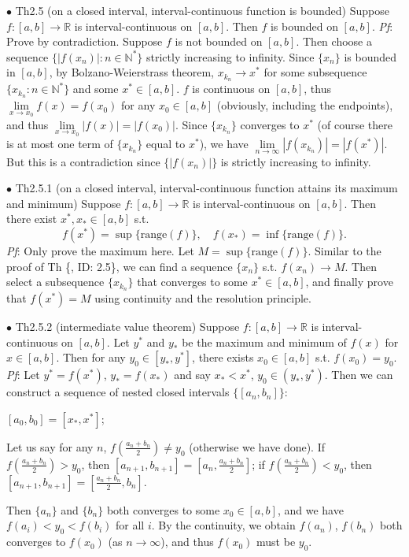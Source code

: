 \documentclass{article}
\begin{document}
\begin{Th}{$\bullet$ Th2.5 (on a closed interval, interval-continuous function is bounded)}
    Suppose $f:[a,b]\rightarrow\mathbb{R}$ is interval-continuous on $[a,b]$. Then $f$ is bounded on $[a,b]$.
    \tcblower
    \textit{Pf}: Prove by contradiction. Suppose $f$ is not bounded on $[a,b]$. Then choose a sequence $\{|f(x_n)|: n\in\mathbb{N}^*\}$ strictly increasing to infinity. Since $\{x_n\}$ is bounded in $[a,b]$, by Bolzano-Weierstrass theorem, $x_{k_n}\rightarrow x^*$ for some subsequence $\{x_{k_n}: n\in\mathbb{N}^*\}$ and some $x^*\in [a,b]$. $f$ is continuous on $[a,b]$, thus $\lim\limits_{x\to x_0}f(x) = f(x_0)$ for any $x_0\in[a,b]$ (obviously, including the endpoints), and thus $\lim\limits_{x\to x_0}|f(x)| = |f(x_0)|$. Since $\{x_{k_n}\}$ converges to $x^*$ (of course there is at most one term of $\{x_{k_n}\}$ equal to $x^*$), we have $\lim\limits_{n\to\infty}|f(x_{k_n})| = |f(x^*)|$. But this is a contradiction since $\{|f(x_n)|\}$ is strictly increasing to infinity.
\end{Th}

\begin{Th}{$\bullet$ Th2.5.1 (on a closed interval, interval-continuous function attains its maximum and minimum)}
    Suppose $f:[a,b]\rightarrow\mathbb{R}$ is interval-continuous on $[a,b]$. Then there exist $x^*, x_*\in [a,b]$ s.t. 
    $$f(x^*) = \sup\{\text{range}(f)\}, \quad f(x_*) = \inf\{\text{range}(f)\}.$$
    \tcblower
    \textit{Pf}: Only prove the maximum here. Let $M = \sup\{\text{range}(f)\}$. Similar to the proof of Th \{, ID: 2.5\}, we can find a sequence $\{x_n\}$ s.t. $f(x_n)\rightarrow M$. Then select a subsequence $\{x_{k_n}\}$ that converges to some $x^*\in[a,b]$, and finally prove that $f(x^*) = M$ using continuity and the resolution principle.
\end{Th}

\begin{Th}{$\bullet$ Th2.5.2 (intermediate value theorem)}
    Suppose $f:[a,b]\rightarrow\mathbb{R}$ is interval-continuous on $[a,b]$. Let $y^*$ and $y_*$ be the maximum and minimum of $f(x)$ for $x\in [a,b]$. Then for any $y_0\in [y_*, y^*]$, there exists $x_0\in [a,b]$ s.t. $f(x_0) = y_0$.
    \tcblower
    \textit{Pf}: Let $y^* = f(x^*)$, $y_* = f(x_*)$ and say $x_*<x^*$, $y_0\in(y_*, y^*)$. Then we can construct a sequence of nested closed intervals $\{[a_n, b_n]\}$:
    \begin{compactitem}
        \item $[a_0, b_0] = [x_*, x^*]$;
        \item Let us say for any $n$, $f(\frac{a_n+b_n}{2})\neq y_0 $ (otherwise we have done). If $f(\frac{a_n+b_n}{2})> y_0$, then $[a_{n+1}, b_{n+1}] = [a_n, \frac{a_n+b_n}{2}]$; if $f(\frac{a_n+b_n}{2})< y_0$, then $[a_{n+1}, b_{n+1}] = [\frac{a_n+b_n}{2}, b_n]$.
    \end{compactitem}
    Then $\{a_n\}$ and $\{b_n\}$ both converges to some $x_0\in [a,b]$, and we have $f(a_i)<y_0<f(b_i)$ for all $i$. By the continuity, we obtain $f(a_n)$, $f(b_n)$ both converges to $f(x_0)$ (as $n\rightarrow\infty$), and thus $f(x_0)$ must be $y_0$.
\end{Th}
\end{document}

